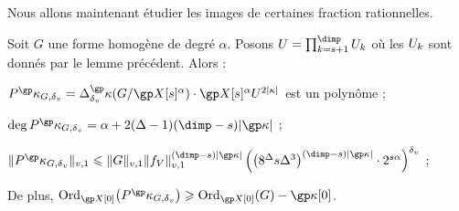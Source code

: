 Nous allons maintenant étudier les images de certaines fraction rationnelles.

\begin{lem} \label{l:par-anyvar-mono}
  Soit \( G \) une forme homogène de degré \( \alpha \). Posons \( \pden =
    \prod_{\ind = \anydim + 1}^{\dimp} \pden_\ind \) où les \( U_k \)
  sont donnés par le lemme précédent. Alors :
  \begin{enumthm}
    \item \( P^\derp_{G, \dv}
        = \pdiff^\derp(G / \vp[\anydim]^\alpha)
        \cdot \vp[\anydim]^\alpha \pden^{2\lgr\kappa} \) est un polynôme ;
    \item \( \deg P^\derp_{G, \dv}
        = \alpha + 2 (\anydeg - 1) (\dimp - \anydim) \lgr\derp \) ;
    \item \( \nv1{ P^\derp_{G, \dv} }
        \le
        \nv1{ G }
        \nv1{ \chow\anyvar }^{(\dimp - \anydim) \lgr\derp}
        \left(
          \bigl( 8^\Delta \anydim \anydeg^{3} \bigr) ^{
            (\dimp - \anydim) \lgr\derp }
          \cdot 2^{ \anydim \alpha }
        \right)^\dv
      \) ;
  \end{enumthm}
  De plus, \( \ord_{\vp[0]} \bigl( P^\derp_{G, \dv} \bigr)
    \ge \ord_{\vp[0]} (G)  - \derp[0] \).
\end{lem}


